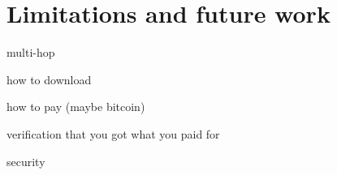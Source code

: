\section{Limitations and future work}
\label{sec:limits}
multi-hop

how to download

how to pay (maybe bitcoin)

verification that you got what you paid for

security
